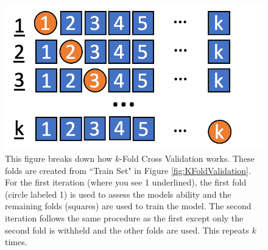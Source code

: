 \begin{figure}[!htb]
    \centering
      \centering
      \includegraphics[width=\textwidth]{figures/ppt/KFoldValidationExplain.png}
     
    
    \caption{
	This figure breaks down how \(k\)-Fold Cross Validation works. These folds are created from ``Train Set" in Figure \ref{fig:KFoldValidation}. For the first iteration (where you see 1 underlined), the first fold (circle labeled 1) is used to assess the models ability and the remaining folds (squares) are used to train the model. The second iteration follows the same procedure as the first except only the second fold is withheld and the other folds are used. This repeats \(k\) times.
      }
\label{fig:KFoldValidationExplain}
  \end{figure}




\clearpage


